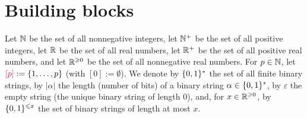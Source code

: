 \documentclass{patmorin}
\makeatletter
\renewcommand{\ge}{\geqslant}
\renewcommand{\le}{\leqslant}
\renewcommand{\geq}{\geqslant}
\newcommand{\defin}[1]{\emph{\textcolor{brightmaroon}{#1}}}
\def\mathcolor#1#{\@mathcolor{#1}}
\def\@mathcolor#1#2#3{%
  \protect\leavevmode
  \begingroup
    \color#1{#2}#3%
  \endgroup
}
\newcommand{\mathdefin}[1]{\mathcolor{brightmaroon}{#1}}
\DeclarePairedDelimiter{\set}{\{}{\}}
\newcommand{\calG}{\mathcal{G}}
\makeatother
\begin{document}







\section{Building blocks}\label{building_blocks}

Let \defin{$\mathbb{N}$} be the set of all nonnegative integers, let \defin{$\mathbb{N}^+$} be the set of all positive integers, let \defin{$\mathbb{R}$} be the set of all real numbers, let \defin{$\mathbb{R}^+$} be the set of all positive real numbers, and let \defin{$\R^{\ge 0}$} be the set of all nonnegative real numbers.  For $p\in\mathbb{N}$, let $\mathdefin{[p]} := \set{1,\dots,p}$ (with $[0]:=\emptyset$).  We denote by \defin{$\set{0,1}^*$} the set of all finite binary strings, by \defin{$|\alpha|$} the length (number of bits) of a binary string $\alpha\in\set{0,1}^*$, by \defin{$\varepsilon$} the empty string (the unique binary string of length $0$), and, for $x\in\R^{\ge 0}$, by \defin{$\set{0,1}^{\le x}$} the set of binary strings of length at most $x$.
\end{document}
